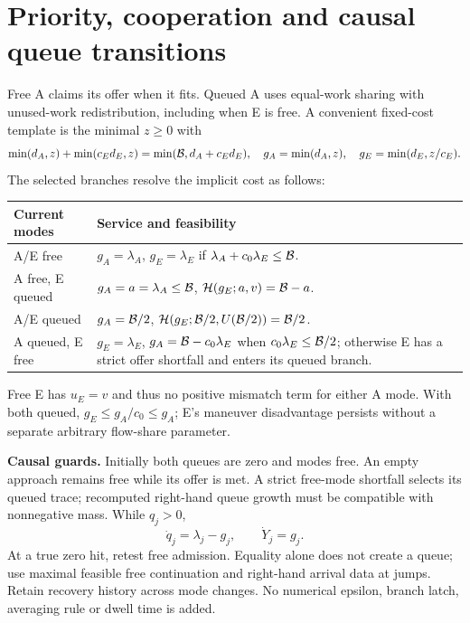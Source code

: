 \section{Priority, cooperation and causal queue transitions}
\label{sec:allocation}
Free A claims its offer when it fits. Queued A uses equal-work sharing
with unused-work redistribution, including when E is free. A convenient
fixed-cost template is the minimal $z\geq0$ with
\begin{equation}
 \min(d_A,z)+\min(c_Ed_E,z)=\min(\mathcal B,d_A+c_Ed_E),\quad
 g_A=\min(d_A,z),\quad g_E=\min(d_E,z/c_E).
 \label{eq:equalwork}
\end{equation}
The selected branches resolve the implicit cost as follows:
\begin{center}
\begin{tabular}{>{\raggedright\arraybackslash}p{27mm}>{\raggedright\arraybackslash}p{120mm}}
\toprule
Current modes & Service and feasibility\\
\midrule
A/E free & $g_A=\lambda_A$, $g_E=\lambda_E$ if
$\lambda_A+c_0\lambda_E\leq\mathcal B$.\\[5pt]
A free, E queued & $g_A=a=\lambda_A\leq\mathcal B$,
$\mathcal H(g_E;a,v)=\mathcal B-a$.\\[5pt]
A/E queued & $g_A=\mathcal B/2$,
$\mathcal H(g_E;\mathcal B/2,U(\mathcal B/2))=\mathcal B/2$.\\[5pt]
A queued, E free & $g_E=\lambda_E$, $g_A=\mathcal B-c_0\lambda_E$
when $c_0\lambda_E\leq\mathcal B/2$; otherwise E has a strict offer
shortfall and enters its queued branch.\\
\bottomrule
\end{tabular}
\end{center}
Free E has $u_E=v$ and thus no positive mismatch term for either A mode.
With both queued, $g_E\leq g_A/c_0\leq g_A$; E's maneuver disadvantage
persists without a separate arbitrary flow-share parameter.

\textbf{Causal guards.} Initially both queues are zero and modes free.
An empty approach remains free while its offer is met. A strict free-mode
shortfall selects its queued trace; recomputed right-hand queue growth
must be compatible with nonnegative mass. While $q_j>0$,
\begin{equation}
 \dot q_j=\lambda_j-g_j,\qquad \dot Y_j=g_j. \label{eq:queuedynamics}
\end{equation}
At a true zero hit, retest free admission. Equality alone does not create
a queue; use maximal feasible free continuation and right-hand arrival
data at jumps. Retain recovery history across mode changes. No numerical
epsilon, branch latch, averaging rule or dwell time is added.

